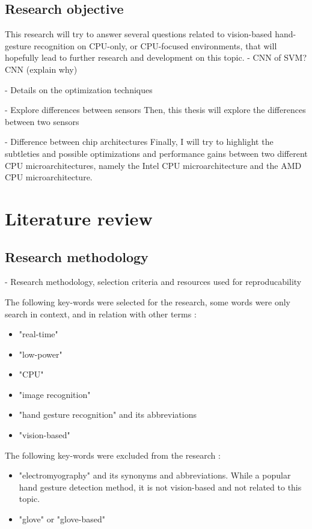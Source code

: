 \documentclass[12pt]{article}
\begin{document}
\subsection{Research objective}

This research will try to answer several questions related to vision-based hand-gesture recognition on CPU-only, or CPU-focused environments, that will hopefully lead to further research and development on this topic.
- CNN of SVM?
CNN (explain why)

- Details on the optimization techniques

- Explore differences between sensors
Then, this thesis will explore the differences between two sensors 

- Difference between chip architectures
Finally, I will try to highlight the subtleties and possible optimizations and performance gains between two different CPU microarchitectures, namely the Intel CPU microarchitecture and the AMD CPU microarchitecture. 

\section{Literature review}

\subsection{Research methodology}

- Research methodology, selection criteria and resources used for reproducability

The following key-words were selected for the research, some words were only search in context, and in relation with other terms :
\begin{itemize}
  \item "real-time"
  \item "low-power"
  \item "CPU"
  \item "image recognition"
  \item "hand gesture recognition" and its abbreviations
  \item "vision-based"
\end{itemize}

The following key-words were excluded from the research :
\begin{itemize}
  \item "electromyography" and its synonyms and abbreviations. While a popular hand gesture detection method, it is not vision-based and not related to this topic.
  \item "glove" or "glove-based"
\end{itemize}
\end{document}
